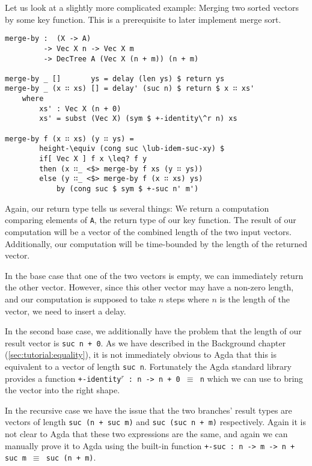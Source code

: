 Let us look at a slightly more complicated example: Merging two sorted vectors by some key function. This is a prerequisite to later implement merge sort.

\begin{lstlisting}[caption={Merging sorted vectors},label={lst:merge},emph={merge,by,DecTree,delay,return,delay',if,then,else}]
merge-by :  (X -> A)
         -> Vec X n -> Vec X m
         -> DecTree A (Vec X (n + m)) (n + m)

merge-by _ []       ys = delay (len ys) $ return ys
merge-by _ (x ∷ xs) [] = delay' (suc n) $ return $ x ∷ xs'
    where
        xs' : Vec X (n + 0)
        xs' = subst (Vec X) (sym $ +-identity\^r n) xs

merge-by f (x ∷ xs) (y ∷ ys) =
        height-\equiv (cong suc \lub-idem-suc-xy) $
        if[ Vec X ] f x \leq? f y
        then (x ∷_ <$> merge-by f xs (y ∷ ys))
        else (y ∷_ <$> merge-by f (x ∷ xs) ys)
            by (cong suc $ sym $ +-suc n' m')
\end{lstlisting}

Again, our return type tells us several things: We return a computation comparing elements of \texttt{A}, the return type of our key function. The result of our computation will be a vector of the combined length of the two input vectors. Additionally, our computation will be time-bounded by the length of the returned vector.

In the base case that one of the two vectors is empty, we can immediately return the other vector. However, since this other vector may have a non-zero length, and our computation is supposed to take $n$ steps where $n$ is the length of the vector, we need to insert a delay.

In the second base case, we additionally have the problem that the length of our result vector is \texttt{suc n + 0}. As we have described in the Background chapter (\autoref{sec:tutorial:equality}), it is not immediately obvious to Agda that this is equivalent to a vector of length \texttt{suc n}. Fortunately the Agda standard library provides a function \texttt{+-identity$^r$ : n -> n + 0 $\equiv$ n} which we can use to bring the vector into the right shape.

In the recursive case we have the issue that the two branches' result types are vectors of length \texttt{suc (n + suc m)} and \texttt{suc (suc n + m)} respectively. Again it is not clear to Agda that these two expressions are the same, and again we can manually prove it to Agda using the built-in function \texttt{+-suc : n -> m -> n + suc m $\equiv$ suc (n + m)}.

